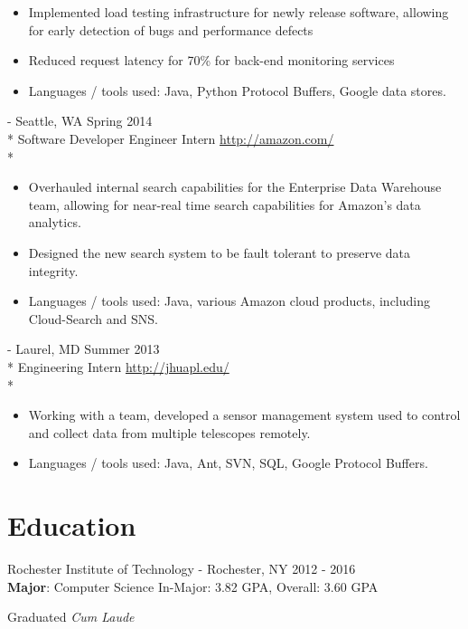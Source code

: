 \documentclass[a4paper,margin,line]{resume}
\newcommand{\rurl}[1]{\hfill {\footnotesize \url{#1}}}
\newcommand{\rdate}[1]{\hfill {\small #1}}
\renewcommand{\employer}[5]{ \item[#1] - #2 \rdate{#3} \\* #4 \rurl{#5} \\*}
\begin{document}
\begin{resume}
\begin{asparadesc}
    \begin{itemize}
    \item Implemented load testing infrastructure for newly release software, allowing for early
      detection of bugs and performance defects
    \item Reduced request latency for 70\% for back-end monitoring services
    \item Languages / tools used: Java, Python Protocol Buffers, Google data stores.
    \end{itemize}
    \employer{Amazon}{Seattle, WA}{Spring 2014}{Software Developer Engineer
      Intern}{http://amazon.com/}
    \vspace{-5mm}
    \begin{itemize}
    \item Overhauled internal search capabilities for the Enterprise Data Warehouse team, allowing
      for near-real time search capabilities for Amazon's data analytics.
    \item Designed the new search system to be fault tolerant to preserve data integrity.
    \item Languages / tools used: Java, various Amazon cloud products, including Cloud-Search and
      SNS.
    \end{itemize}
    \employer{John Hopkins University Applied Physics Lab}{Laurel, MD}{Summer 2013}{Engineering
      Intern}{http://jhuapl.edu/}
    \vspace{-5mm}
    \begin{itemize}
    \item Working with a team, developed a sensor management system used to control and collect
      data from multiple telescopes remotely.
    \item Languages / tools used: Java, Ant, SVN, SQL, Google Protocol Buffers.
    \end{itemize}
  \end{asparadesc}
  \section{\mysidestyle Education}
  \begin{compactdesc}
  \item[Rochester Institute of Technology] - Rochester, NY \rdate{2012 - 2016} \\
    \textbf{Major}: Computer Science \rdate{In-Major: 3.82 GPA, Overall: 3.60 GPA} \\
    \vspace{-4mm}
    \begin{flushright} Graduated \textit{Cum Laude} \end{flushright}
  \end{compactdesc}

\end{resume}
\end{document}
